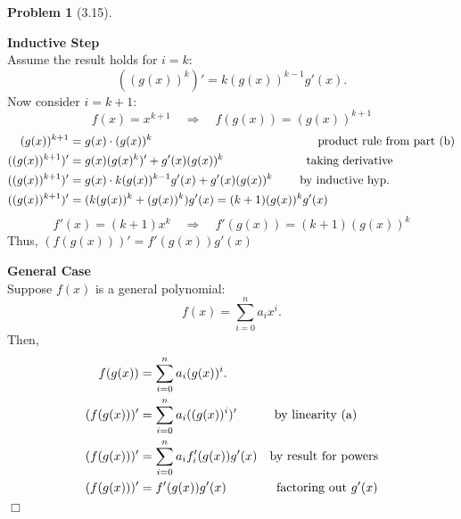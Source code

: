 \documentclass[12pt]{article}
\theoremstyle{definition}
\newtheorem{problem}{Problem}
\begin{document}
\begin{problem}[3.15]
\begin{enumerate}[label=(\alph*)]
\begin{solution}
            \textbf{Inductive Step}\\
            Assume the result holds for $i = k$:
            \[
                ((g(x))^k)' = k (g(x))^{k-1} g'(x).
            \]
            Now consider $i = k+1$:
                \[ f(x) = x^{k+1} \quad \Rightarrow \quad f(g(x)) = (g(x))^{k+1} \]
                \begin{align*}
                    (g(x))^{k+1} &= g(x) \cdot (g(x))^k \quad \hspace{130px} \text{product rule from part (b)}\\
                    ((g(x))^{k+1})' &= g(x) (g(x)^k)' + g'(x) (g(x))^k \quad \hspace{60px} \text{taking derivative}\\
                    ((g(x))^{k+1})' &= g(x) \cdot k (g(x))^{k-1} g'(x) + g'(x) (g(x))^k \quad \hspace{13px} \text{by inductive hyp.}\\
                    ((g(x))^{k+1})' &= (k (g(x))^k + (g(x))^k) g'(x) = (k+1) (g(x))^k g'(x)
                \end{align*}
                \[ f'(x) = (k+1) x^k \quad \Rightarrow \quad f'(g(x)) = (k+1) (g(x))^k \]
                Thus, $(f(g(x)))' = f'(g(x)) g'(x)$

            \textbf{General Case}\\ 
            Suppose $f(x)$ is a general polynomial:
            \[
            f(x) = \sum_{i=0}^{n} a_i x^i.
            \]
            Then,
            \begin{align*}
                f(g(x)) &= \sum_{i=0}^{n} a_i (g(x))^i.\\
                (f(g(x)))' &= \sum_{i=0}^{n} a_i ((g(x))^i)' \quad \hspace{20px} \text{by linearity (a)}\\
                (f(g(x)))' &= \sum_{i=0}^{n} a_i f'_i(g(x)) g'(x) \quad \text{by result for powers}\\
                (f(g(x)))' &= f'(g(x)) g'(x) \quad \hspace{30px} \text{factoring out $g'(x)$}
            \end{align*}
            \hspace{5in} $\Box$
        \end{solution}
    \end{enumerate}
\end{problem}
\end{document}
